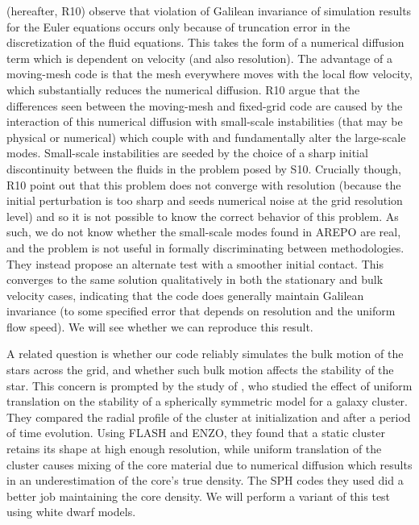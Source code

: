 \documentclass[iop]{../emulateapj}
\begin{document}
\citet{robertson:2010} (hereafter, R10) observe that violation of Galilean
invariance of simulation results for the Euler equations occurs only
because of truncation error in the discretization of the fluid
equations. This takes the form of a numerical diffusion term which is
dependent on velocity (and also resolution). The advantage of a
moving-mesh code is that the mesh everywhere moves with the local flow
velocity, which substantially reduces the numerical
diffusion. R10 argue that the differences seen
between the moving-mesh and fixed-grid code are caused by the
interaction of this numerical diffusion with small-scale instabilities
(that may be physical or numerical) which couple with and
fundamentally alter the large-scale modes. Small-scale instabilities
are seeded by the choice of a sharp initial discontinuity between the 
fluids in the problem posed by S10. Crucially though,
R10 point out that this problem does not
converge with resolution (because the initial perturbation is too sharp 
and seeds numerical noise at the grid resolution level) 
and so it is not possible to know the correct
behavior of this problem. As such, we do not know whether the
small-scale modes found in AREPO are real, and the problem is not
useful in formally discriminating between methodologies. They instead
propose an alternate test with a smoother initial contact. This
converges to the same solution qualitatively in both the stationary
and bulk velocity cases, indicating that the code does generally
maintain Galilean invariance (to some specified error that depends on
resolution and the uniform flow speed).  We will see whether we can
reproduce this result.

A related question is whether our code reliably simulates the bulk
motion of the stars across the grid, and whether such bulk motion
affects the stability of the star. This concern is prompted by the
study of \cite{tasker:2008}, who studied the effect of uniform
translation on the stability of a spherically symmetric model for a
galaxy cluster. They compared the radial profile of the cluster at
initialization and after a period of time evolution. Using FLASH and
ENZO, they found that a static cluster retains its shape at high
enough resolution, while uniform translation of the cluster causes
mixing of the core material due to numerical diffusion which results
in an underestimation of the core's true density. The SPH codes they
used did a better job maintaining the core density. We will perform a
variant of this test using white dwarf models.
\end{document}
